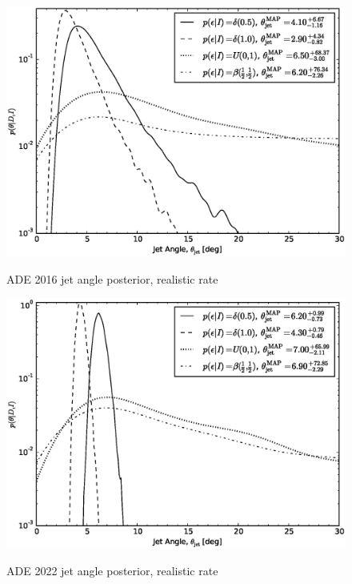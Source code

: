 \documentclass[twocolumn,nofootinbib]{revtex4-1}
\begin{document}
\begin{figure}
\centering
{\includegraphics[width=\linewidth]{jet_angle_posterior_aligo_2016_re_real.eps}}
\caption{ADE 2016 jet angle posterior, realistic rate}
\end{figure}

\begin{figure}
\centering
{\includegraphics[width=\linewidth]{jet_angle_posterior_aligo_2022_re_real.eps}}
\caption{ADE 2022 jet angle posterior, realistic rate}
\end{figure}
\end{document}
